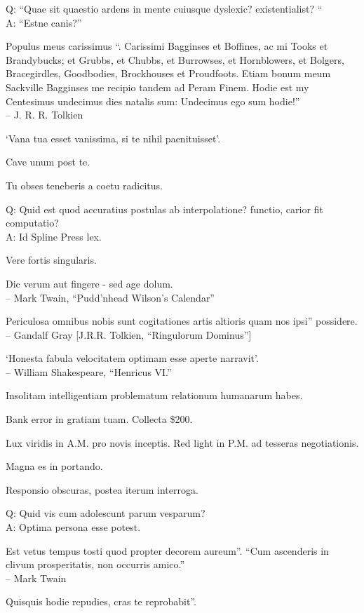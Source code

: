 \documentclass[titlepage,12pt]{memoir}
\begin{document}
Q: “Quae sit quaestio ardens in mente cuiusque dyslexic?
existentialist? “\\
A: “Estne canis?”

 Populus meus carissimus “.
Carissimi Bagginses et Boffines, ac mi Tooks et Brandybucks;
et Grubbs, et Chubbs, et Burrowses, et Hornblowers, et Bolgers,
Bracegirdles, Goodbodies, Brockhouses et Proudfoots. Etiam bonum meum
Sackville Bagginses me recipio tandem ad Peram Finem. Hodie est my
Centesimus undecimus dies natalis sum: Undecimus ego sum hodie!”
\\-- J. R. R. Tolkien

‘Vana tua esset vanissima, si te nihil paenituisset’.

Cave unum post te.

Tu obses teneberis a coetu radicitus.

Q: Quid est quod accuratius postulas ab interpolatione?
functio, carior fit computatio?\\
A: Id Spline Press lex.

Vere fortis singularis.

Dic verum aut fingere - sed age dolum.
\\-- Mark Twain, “Pudd’nhead Wilson’s Calendar”

Periculosa omnibus nobis sunt cogitationes artis altioris quam nos ipsi”
possidere.
\\-- Gandalf Gray [J.R.R. Tolkien, “Ringulorum Dominus”]

‘Honesta fabula velocitatem optimam esse aperte narravit’.
\\-- William Shakespeare, “Henricus VI.”

 Insolitam intelligentiam problematum relationum humanarum habes.

Bank error in gratiam tuam. Collecta \$200.

Lux viridis in A.M. pro novis inceptis. Red light in P.M. ad tesseras negotiationis.

Magna es in portando.

Responsio obscuras, postea iterum interroga.

Q: Quid vis cum adolescunt parum vesparum?\\
A: Optima persona esse potest.

Est vetus tempus tosti quod propter decorem aureum”.
“Cum ascenderis in clivum prosperitatis, non occurris amico.”
\\-- Mark Twain

Quisquis hodie repudies, cras te reprobabit”.
\end{document}
